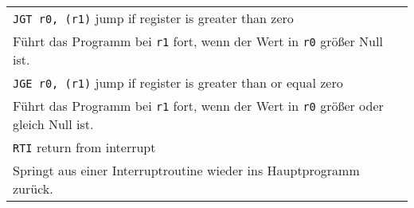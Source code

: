 {\begin{longtable}{|p{\textwidth}|}
        \hline
        \verb|JGT r0, (r1)|
        \hfill {\footnotesize jump if register is greater than zero}
        \\
        Führt das Programm bei \texttt{r1} fort, wenn der Wert in \texttt{r0}
        größer Null ist.
        \\

        \hline
        \verb|JGE r0, (r1)|
        \hfill {\footnotesize jump if register is greater than or equal zero}
        \\
        Führt das Programm bei \texttt{r1} fort, wenn der Wert in \texttt{r0}
        größer oder gleich Null ist.
        \\

        \hline
        \hline

        \hline
        \verb|RTI|
        \hfill {\footnotesize return from interrupt}
        \\
        Springt aus einer Interruptroutine wieder ins Hauptprogramm zurück.
        \\

        \hline
    \end{longtable}
}

%

